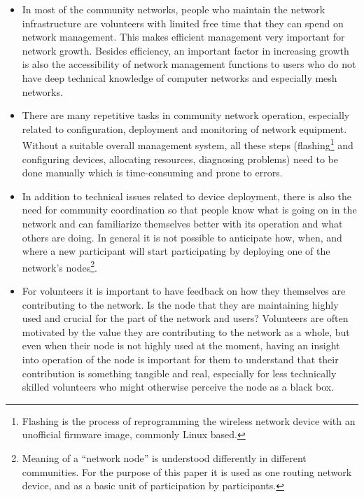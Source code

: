 \documentclass[5p,sort&compress]{elsarticle}
\begin{document}
\begin{itemize}
\item In most of the community networks, people who maintain the network infrastructure are volunteers with limited free time that they can spend on network management.
This makes efficient management very important for network growth.
Besides efficiency, an important factor in increasing growth is also the accessibility of network management functions to users who do not have deep technical knowledge of computer networks and especially mesh networks.

\item There are many repetitive tasks in community network operation, especially related to configuration, deployment and monitoring of network equipment.
Without a suitable overall management system, all these steps (flashing\footnote{Flashing is the process of reprogramming the wireless network device with an unofficial firmware image, commonly Linux based.} and configuring devices, allocating resources, diagnosing problems) need to be done manually which is time-consuming and prone to errors.

\item In addition to technical issues related to device deployment, there is also the need for community coordination so that people know what is going on in the network and can familiarize themselves better with its operation and what others are doing.
In general it is not possible to anticipate how, when, and where a new participant will start participating by deploying one of the network's nodes\footnote{Meaning of a ``network node'' is understood differently in different communities. For the purpose of this paper it is used as one routing network device, and as a basic unit of participation by participants.}.

\item For volunteers it is important to have feedback on how they themselves are contributing to the network.
Is the node that they are maintaining highly used and crucial for the part of the network and users?
Volunteers are often motivated by the value they are contributing to the network as a whole, but even when their node is not highly used at the moment, having an insight into operation of the node is important for them to understand that their contribution is something tangible and real, especially for less technically skilled volunteers who might otherwise perceive the node as a black box.
\end{itemize}
\end{document}
